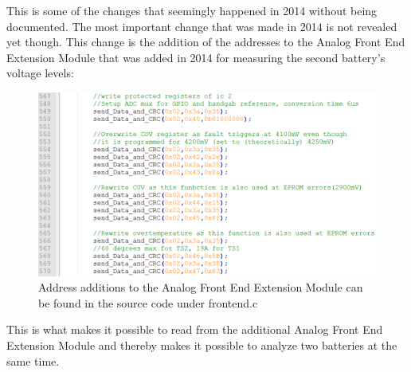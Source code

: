 This is some of the changes that seemingly happened in 2014 without being documented. The most important change that was made in 2014 is not revealed yet though. This change is the addition of the addresses to the Analog Front End Extension Module that was added in 2014 for measuring the second battery's voltage levels:\\
\begin{figure}[H]
	\centering
	\includegraphics[width=1.0\linewidth]{Software/AddressAdditionsBMS.PNG}
	\caption{Address additions to the Analog Front End Extension Module can be found in the source code under frontend.c}
	\label{fig:AddressAdditions_BMS}
\end{figure}

This is what makes it possible to read from the additional Analog Front End Extension Module and thereby makes it possible to analyze two batteries at the same time.



